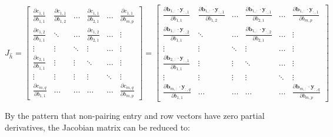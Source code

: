 \documentclass{article}
\begin{document}
\begin{center}$
J_{\widehat{h}} = 
\begin{bmatrix}
    \frac{\partial c_{1,1}}{\partial b_{1,1}} & \frac{\partial c_{1,1}}{\partial b_{1,2}} &\hdots &  \frac{\partial c_{1,1}}{\partial b_{2,1}} &\hdots & \frac{\partial c_{1,1}}{\partial b_{m,p}} \\
    \frac{\partial c_{1,2}}{\partial b_{1,1}}  & \ddots &\hdots & \frac{\partial c_{1,2}}{\partial b_{2,1}}& \hdots& \vdots \\
    \vdots & \vdots & \ddots & \vdots & \hdots & \vdots\\
    \frac{\partial c_{2,1}}{\partial b_{1,1}} & \vdots & \vdots & \ddots & \hdots & \vdots\\
    \vdots & \vdots & \vdots & \vdots & \ddots & \vdots\\
    \frac{\partial c_{m,q}}{\partial b_{1,1}}  & \hdots & \hdots & \hdots & \hdots & \frac{\partial c_{m,q}}{\partial b_{m,p}}
\end{bmatrix}
=
\begin{bmatrix}
    \frac{\partial \mathbf{b}_{1,:} \cdot \mathbf{y}_{:,1} }{\partial b_{1,1}} & \frac{\partial \mathbf{b}_{1,:} \cdot \mathbf{y}_{:,1} }{\partial b_{1,2}} &\hdots &  \frac{\partial \mathbf{b}_{1,:} \cdot \mathbf{y}_{:,1} }{\partial b_{2,1}} &\hdots & \frac{\partial \mathbf{b}_{1,:} \cdot \mathbf{y}_{:,1} }{\partial b_{m,p}} \\
    \frac{\partial \mathbf{b}_{1,:} \cdot \mathbf{y}_{:,2} }{\partial b_{1,1}}  & \ddots &\hdots & \frac{\partial \mathbf{b}_{1,:} \cdot \mathbf{y}_{:,2} }{\partial b_{2,1}}& \hdots& \vdots \\
    \vdots & \vdots & \ddots & \vdots & \hdots & \vdots\\
    \frac{\partial \mathbf{b}_{2,:} \cdot \mathbf{y}_{:,1} }{\partial b_{1,1}} & \vdots & \vdots & \ddots & \hdots & \vdots\\
    \vdots & \vdots & \vdots & \vdots & \ddots & \vdots\\
    \frac{\partial \mathbf{b}_{m,:} \cdot \mathbf{y}_{:,q} }{\partial b_{1,1}}  & \hdots & \hdots & \hdots & \hdots & \frac{\partial \mathbf{b}_{m,:} \cdot \mathbf{y}_{:,q} }{\partial b_{m,p}}
\end{bmatrix}
$
\end{center}
By the pattern that non-pairing entry and row vectors have zero partial derivatives, the Jacobian matrix can be reduced to:
\end{document}
